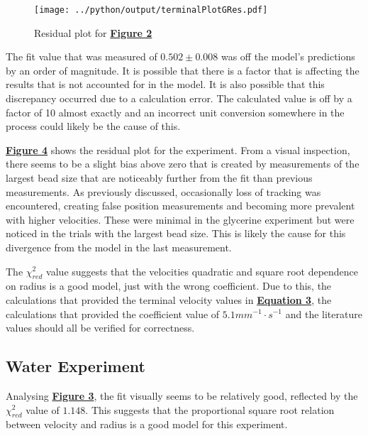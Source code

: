 \documentclass[
	letterpaper
	12pt
]{template}
\newcommand{\bref}[2]{\textbf{\hyperref[#1]{#2}}}
\begin{document}
\begin{figure}\label{fig::terminalPlotGRes}
	\vspace{-30pt}
	\centering
	\texttt{[image: ../python/output/terminalPlotGRes.pdf]}
	\caption{Residual plot for \bref{fig::terminalPlotG}{Figure 2}}
	\vspace{-20pt}
\end{figure}

The fit value that was measured of $0.502\pm0.008$ was off the model's predictions by an order of magnitude. It is possible that there is a factor that is affecting the results that is not accounted for in the model. It is also possible that this discrepancy occurred due to a calculation error. The calculated value is off by a factor of 10 almost exactly and an incorrect unit conversion somewhere in the process could likely be the cause of this. \vspace{\baselineskip}

\bref{fig::terminalPlotGRes}{Figure 4} shows the residual plot for the experiment. From a visual inspection, there seems to be a slight bias above zero that is created by measurements of the largest bead size that are noticeably further from the fit than previous measurements. As previously discussed, occasionally loss of tracking was encountered, creating false position measurements and becoming more prevalent with higher velocities. These were minimal in the glycerine experiment but were noticed in the trials with the largest bead size. This is likely the cause for this divergence from the model in the last measurement. \vspace{\baselineskip}

The $\chi_{red}^2$ value suggests that the velocities quadratic and square root dependence on radius is a good model, just with the wrong coefficient. Due to this, the calculations that provided the terminal velocity values in \bref{eqn::terminalVelocity}{Equation 3}, the calculations that provided the coefficient value of $5.1\unit{mm^{-1}\cdot s^{-1}}$ and the literature values should all be verified for correctness.

\subsection{Water Experiment}
Analysing \bref{fig::terminalPlotW}{Figure 3}, the fit visually seems to be relatively good, reflected by the $\chi_{red}^2$ value of $1.148$. This suggests that the proportional square root relation between velocity and radius is a good model for this experiment.\vspace{\baselineskip}
\end{document}

